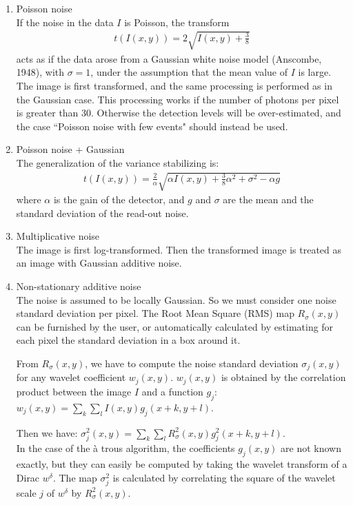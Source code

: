 \begin{itemize}
\begin{enumerate}
\item{Poisson noise} \\
If the noise in the data $I$ is Poisson, the transform 
\begin{eqnarray}
t(I(x,y)) = 2\sqrt{I(x,y) + \frac{3}{8}}
\end{eqnarray}
acts as if the data arose from a
Gaussian white noise model (Anscombe, 1948), with $\sigma = 1$, under the
assumption that the mean value of $I$ is large.  
The image is first transformed, and the same processing is performed
as in the Gaussian case. This processing works if the number of photons
per pixel is greater than 30. Otherwise the detection levels will be
over-estimated, and the case ``Poisson noise with few events" should 
instead be used.


\item{Poisson noise + Gaussian} \\
The  generalization of the variance stabilizing is:
\begin{eqnarray*}
t(I(x,y)) = \frac{2}{\alpha} \sqrt{\alpha I(x,y) + \frac{3}{8} \alpha^2 + \sigma^2 -
\alpha g}
 \end{eqnarray*}
where $\alpha$ is the gain of the detector, and $g$ and $\sigma$ are the mean and
the standard deviation of the read-out noise.  

\item{Multiplicative noise} \\
The image is first log-transformed. Then the transformed image is treated 
as an image with Gaussian additive noise.

\item{Non-stationary additive noise} \\
The noise is assumed to be locally Gaussian. So we must consider one 
noise standard deviation per pixel. The Root Mean Square (RMS) map $R_{\sigma}(x,y)$
can be furnished by the user, or automatically calculated by estimating
for each pixel the standard deviation in a box around it.

From $R_{\sigma}(x,y)$, we have to compute the noise standard deviation
$\sigma_j(x,y)$ for any wavelet coefficient $w_j(x,y)$. $w_j(x,y)$ is obtained by
the correlation product between the image $I$ and a function 
$g_j$: $w_j(x,y) = \sum_k \sum_l I(x,y)  g_j(x+k,y+l)$.
 
Then we have: $\sigma_j^2(x,y) = \sum_k \sum_l R_{\sigma}^2(x,y) g_j^2(x+k,y+l)$. \\ 
In the case of the \`a trous algorithm, the coefficients $g_j(x,y)$
 are not known exactly, but they can easily be computed by taking the
wavelet transform of a Dirac $w^{\delta}$. The map $\sigma_j^2$ is calculated by 
correlating the square of the wavelet scale $j$ of  $w^{\delta}$
 by $R^2_\sigma(x,y)$.
 

\end{enumerate}
\end{itemize}
